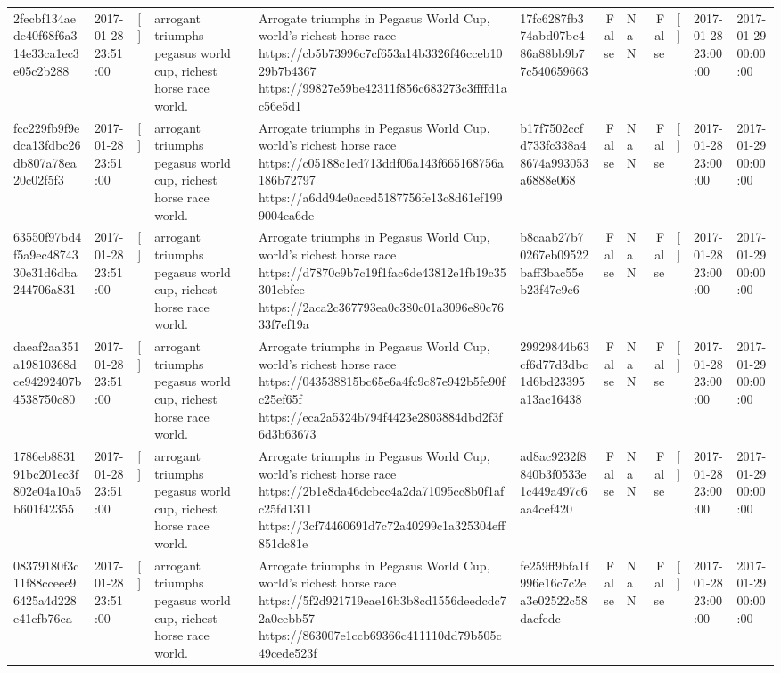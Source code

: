 \begin{tabular}{llllllrlrlll}
2fecbf134aede40f68f6a314e33ca1ec3e05c2b288 & 2017-01-28 23:51:00 & [] & arrogant triumphs pegasus world cup, richest horse race world. & Arrogate triumphs in Pegasus World Cup, world's richest horse race https://cb5b73996c7cf653a14b3326f46cceb1029b7b4367 https://99827e59be42311f856c683273c3ffffd1ac56e5d1 & 17fc6287fb374abd07bc486a88bb9b77c540659663 & False & NaN & False & [] & 2017-01-28 23:00:00 & 2017-01-29 00:00:00 \\
fcc229fb9f9edca13fdbc26db807a78ea20c02f5f3 & 2017-01-28 23:51:00 & [] & arrogant triumphs pegasus world cup, richest horse race world. & Arrogate triumphs in Pegasus World Cup, world's richest horse race https://c05188c1ed713ddf06a143f665168756a186b72797 https://a6dd94e0aced5187756fe13c8d61ef1999004ea6de & b17f7502ccfd733fc338a48674a993053a6888e068 & False & NaN & False & [] & 2017-01-28 23:00:00 & 2017-01-29 00:00:00 \\
63550f97bd4f5a9ec4874330e31d6dba244706a831 & 2017-01-28 23:51:00 & [] & arrogant triumphs pegasus world cup, richest horse race world. & Arrogate triumphs in Pegasus World Cup, world's richest horse race https://d7870c9b7c19f1fac6de43812e1fb19c35301ebfce https://2aca2c367793ea0c380c01a3096e80c7633f7ef19a & b8caab27b70267eb09522baff3bac55eb23f47e9e6 & False & NaN & False & [] & 2017-01-28 23:00:00 & 2017-01-29 00:00:00 \\
daeaf2aa351a19810368dce94292407b4538750c80 & 2017-01-28 23:51:00 & [] & arrogant triumphs pegasus world cup, richest horse race world. & Arrogate triumphs in Pegasus World Cup, world's richest horse race https://043538815bc65e6a4fc9c87e942b5fe90fc25ef65f https://eca2a5324b794f4423e2803884dbd2f3f6d3b63673 & 29929844b63cf6d77d3dbc1d6bd23395a13ac16438 & False & NaN & False & [] & 2017-01-28 23:00:00 & 2017-01-29 00:00:00 \\
1786eb883191bc201ec3f802e04a10a5b601f42355 & 2017-01-28 23:51:00 & [] & arrogant triumphs pegasus world cup, richest horse race world. & Arrogate triumphs in Pegasus World Cup, world's richest horse race https://2b1e8da46dcbcc4a2da71095cc8b0f1afc25fd1311 https://3cf74460691d7c72a40299c1a325304eff851dc81e & ad8ac9232f8840b3f0533e1c449a497c6aa4cef420 & False & NaN & False & [] & 2017-01-28 23:00:00 & 2017-01-29 00:00:00 \\
08379180f3c11f88cceee96425a4d228e41cfb76ca & 2017-01-28 23:51:00 & [] & arrogant triumphs pegasus world cup, richest horse race world. & Arrogate triumphs in Pegasus World Cup, world's richest horse race https://5f2d921719eae16b3b8cd1556deedcdc72a0cebb57 https://863007e1ccb69366c411110dd79b505c49cede523f & fe259ff9bfa1f996e16c7c2ea3e02522c58dacfedc & False & NaN & False & [] & 2017-01-28 23:00:00 & 2017-01-29 00:00:00 \\

\end{tabular}
